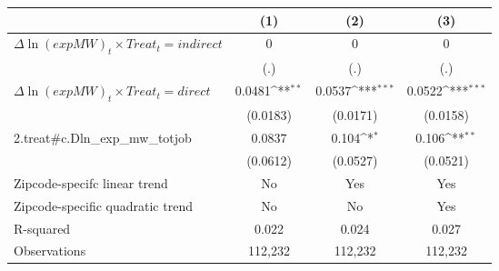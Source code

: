 {
\def\sym#1{\ifmmode^{#1}\else\(^{#1}\)\fi}
\begin{tabular}{l*{3}{c}}
\hline\hline
          &\multicolumn{1}{c}{(1)}         &\multicolumn{1}{c}{(2)}         &\multicolumn{1}{c}{(3)}         \\
\hline
$\Delta \ln(exp MW)_{t} \times Treat_{t}= indirect$&        0         &        0         &        0         \\
          &      (.)         &      (.)         &      (.)         \\
[1em]
$\Delta \ln(exp MW)_{t} \times Treat_{t} = direct$&   0.0481\sym{**} &   0.0537\sym{***}&   0.0522\sym{***}\\
          & (0.0183)         & (0.0171)         & (0.0158)         \\
[1em]
2.treat#c.Dln_exp_mw_totjob&   0.0837         &    0.104\sym{*}  &    0.106\sym{**} \\
          & (0.0612)         & (0.0527)         & (0.0521)         \\
\hline
Zipcode-specifc linear trend&       No         &      Yes         &      Yes         \\
Zipcode-specific quadratic trend&       No         &       No         &      Yes         \\
R-squared &    0.022         &    0.024         &    0.027         \\
Observations&  112,232         &  112,232         &  112,232         \\
\hline\hline
\end{tabular}
}
